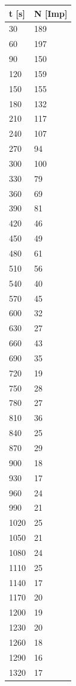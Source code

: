 \begin{minipage}{\linewidth}
    \begin{table}[H]
        \centering
    
    \begin{tabular}{ll}
        \toprule
        t [s] & N [Imp] \\
        \midrule
        30	& 189 \\
        60	& 197 \\
        90	& 150 \\
        120	& 159 \\
        150	& 155 \\
        180	& 132 \\
        210	& 117 \\
        240	& 107 \\
        270	& 94 \\
        300	& 100 \\
        330	& 79 \\
        360	& 69 \\
        390	& 81 \\
        420	& 46 \\
        450	& 49 \\
        480	& 61 \\
        510	& 56 \\
        540	& 40 \\
        570	& 45 \\
        600	& 32 \\
        630	& 27 \\
        660	& 43 \\
        690	& 35 \\
        720	& 19 \\
        750	& 28 \\
        780	& 27 \\
        810	& 36 \\
        840	& 25 \\
        870	& 29 \\
        900	& 18 \\
        930	& 17 \\
        960	& 24 \\
        990	& 21 \\
        1020 &	25 \\
        1050 &	21 \\
        1080 &	24 \\
        1110 &	25 \\
        1140 &	17 \\
        1170 &	20 \\
        1200 &	19 \\
        1230 &	20 \\
        1260 &	18 \\
        1290 &	16 \\
        1320 &	17 \\
        \bottomrule
        
    \end{tabular}
    \label{tab:2}
\end{table}
\end{minipage}


